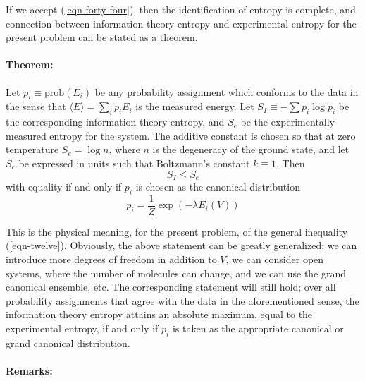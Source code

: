 \documentclass[]{article}
\begin{document}
If we accept (\ref{eqn-forty-four}), then the identification of entropy is complete, and connection between information theory entropy and experimental entropy for the present problem can be stated as a theorem.

\paragraph{Theorem:} Let $p _{i} \equiv  \text{prob} \left( E _{ i }\right)$ be any probability assignment which conforms to the data in the sense that $\langle E \rangle=\sum_{ i } p _{ i } E _{ i }$ is the
measured energy. Let $S_{I} \equiv-\sum p_{i} \log p_{i}$ be the corresponding information theory entropy, and $S _{e}$ be the experimentally measured entropy for the system. The additive constant is chosen so that at zero temperature $S_{e}=\log n$, where $n$ is the degeneracy of the ground state, and let $S_{e}$ be expressed in units such that Boltzmann's constant $k \equiv 1$. Then
\begin{equation}
S _{ I } \leq S _{ e } \label{eqn-forty-five}
\end{equation}
with equality if and only if $p _{ i }$ is chosen as the canonical distribution
\begin{equation}
p_{i}=\frac{1}{Z} \exp \left(-\lambda E_{i}(V)\right) \label{eqn-forty-six}
\end{equation}

This is the physical meaning, for the present problem, of the general inequality (\ref{eqn-twelve}). Obviously, the above statement can be greatly generalized; we can introduce more degrees of freedom in addition to $V$, we can consider open systems, where the number of molecules can change, and we can use the grand canonical ensemble, etc. The corresponding statement will still hold; over all probability assignments that agree with the data in the aforementioned sense, the information theory entropy attains an absolute maximum, equal to the experimental entropy, if and only if $p _{ i }$ is taken as the appropriate canonical or grand canonical distribution. 

\paragraph{Remarks:} 
\end{document}
